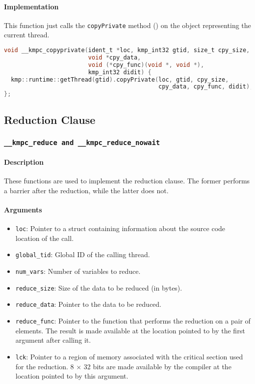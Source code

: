 \paragraph{Implementation} This function just calls the \texttt{copyPrivate} method () on
the object representing the current thread.

\begin{lstlisting}[language=C, caption={__kmpc_copyprivate},
                   label={lst:kmpc-copyprivate}, escapechar=@]
void __kmpc_copyprivate(ident_t *loc, kmp_int32 gtid, size_t cpy_size,
                        void *cpy_data,
                        void (*cpy_func)(void *, void *),
                        kmp_int32 didit) {
  kmp::runtime::getThread(gtid).copyPrivate(loc, gtid, cpy_size,
                                            cpy_data, cpy_func, didit);
};
\end{lstlisting}

\subsection{Reduction Clause}

\subsubsection{\texttt{__kmpc_reduce and __kmpc_reduce_nowait}}

\paragraph{Description} These functions are used to implement the reduction clause. The former
performs a barrier after the reduction, while the latter does not.

\paragraph{Arguments}
\begin{itemize}
	\item \texttt{loc}: Pointer to a struct containing information about the source code location
	      of the call.
	\item \texttt{global_tid}: Global ID of the calling thread.
	\item \texttt{num\_vars}: Number of variables to reduce.
	\item \texttt{reduce\_size}: Size of the data to be reduced (in bytes).
	\item \texttt{reduce\_data}: Pointer to the data to be reduced.
	\item \texttt{reduce\_func}: Pointer to the function that performs the reduction on a pair of
	      elements. The result is made available at the location pointed to by the first argument
	      after calling it.
	\item \texttt{lck}: Pointer to a region of memory associated with the critical section used for
	      the reduction. 8 $\times$ 32 bits are made available by the compiler at the location pointed
	      to by this argument.
\end{itemize}

